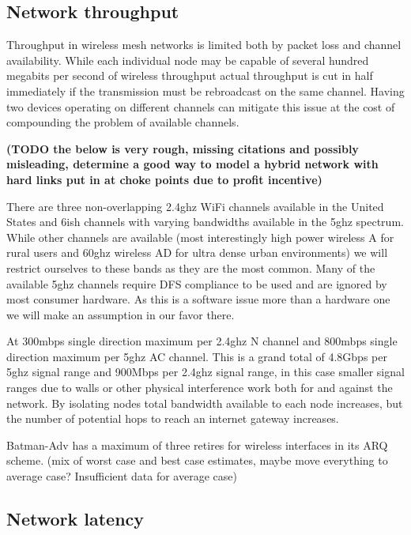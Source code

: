 \documentclass[11pt]{article}
\begin{document}
    \subsection{Network throughput}
    
    Throughput in wireless mesh networks is limited both by packet loss and channel availability. While each individual node may be capable of several hundred megabits per second of wireless throughput actual throughput is cut in half immediately if the transmission must be rebroadcast on the same channel. Having two devices operating on different channels can mitigate this issue at the cost of compounding the problem of available channels. 
    
    \textbf{(TODO the below is very rough, missing citations and possibly misleading, determine a good way to model a hybrid network with hard links put in at choke points due to profit incentive)}
    
    There are three non-overlapping 2.4ghz WiFi channels available in the United States and 6ish channels with varying bandwidths available in the 5ghz spectrum. While other channels are available (most interestingly high power wireless A for rural users and 60ghz wireless AD for ultra dense urban environments) we will restrict ourselves to these bands as they are the most common. Many of the available 5ghz channels require DFS compliance to be used and are ignored by most consumer hardware. As this is a software issue more than a hardware one we will make an assumption in our favor there. 
    
    At 300mbps single direction maximum per 2.4ghz N channel and 800mbps single direction maximum per 5ghz AC channel. This is a grand total of 4.8Gbps per 5ghz signal range and 900Mbps per 2.4ghz signal range, in this case smaller signal ranges due to walls or other physical interference work both for and against the network. By isolating nodes total bandwidth available to each node increases, but the number of potential hops to reach an internet gateway increases. 
    
    Batman-Adv has a maximum of three retires for wireless interfaces in its ARQ scheme. (mix of worst case and best case estimates, maybe move everything to average case? Insufficient data for average case) 
    
    \subsection{Network latency}
    
\end{document}
